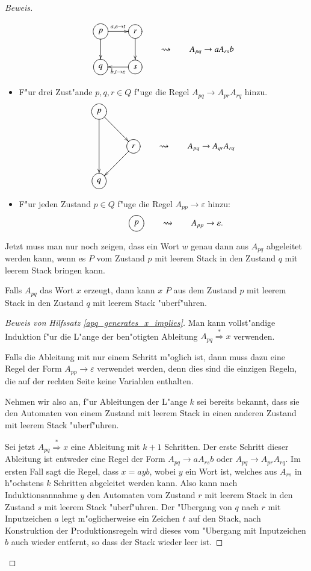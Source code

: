 \begin{proof}[Beweis]
\begin{itemize}
\[
\begin{gathered}
\entrymodifiers={++[o][F]}
\xymatrix{
{p}\ar[d]\ar[r]^{a,\varepsilon\to t}
	&{r}\ar[d]
\\
{q}
	&{s}\ar[l]^{b,t\to\varepsilon}
}
\end{gathered}
\qquad\rightsquigarrow\qquad A_{pq}\to aA_{rs}b
\]


\item F"ur drei Zust"ande $p,q,r\in Q$ f"uge die Regel 
$A_{pq}\to A_{pr}A_{rq}$ hinzu.
\[
\begin{gathered}
\entrymodifiers={++[o][F]}
\xymatrix{
{p}\ar[dr]\ar[dd]
\\
*+\txt{}
	&{r}\ar[dl]
\\
{q}
}
\end{gathered}
\qquad\rightsquigarrow\qquad A_{pq}\to A_{qr}A_{rq}
\]
\item F"ur jeden Zustand $p\in Q$ f"uge die Regel $A_{pp}\to \varepsilon$
hinzu:
\[
\begin{gathered}
\entrymodifiers={++[o][F]}
\xymatrix{
*+\txt{}
	&{p}
}
\end{gathered}
\qquad\rightsquigarrow\qquad
A_{pp}\to\varepsilon.
\]
\end{itemize}
Jetzt muss man nur noch zeigen, dass ein Wort $w$ genau dann aus $A_{pq}$
abgeleitet werden kann, wenn es $P$ vom Zustand $p$ mit leerem Stack
in den Zustand $q$ mit leerem Stack bringen kann.


\begin{hilfssatz}\label{apq_generates_x_implies}
Falls $A_{pq}$ das Wort $x$ erzeugt, dann kann $x$ $P$ aus dem Zustand
$p$ mit leerem Stack in den Zustand $q$ mit leerem Stack "uberf"uhren.
\end{hilfssatz}

\begin{proof}[Beweis von Hilfssatz \ref{apq_generates_x_implies}]
Man kann vollst"andige Induktion f"ur die L"ange der be\-n"otigten 
Ableitung $A_{pq}\overset{*}{\Rightarrow} x$ verwenden.

Falls die Ableitung mit nur einem Schritt m"oglich ist, dann muss
dazu eine Regel der Form $A_{pp}\to\varepsilon$ verwendet werden,
denn dies sind die einzigen Regeln, die auf der rechten Seite
keine Variablen enthalten. 

Nehmen wir also an, f"ur Ableitungen der L"ange $k$ sei bereits
bekannt, dass sie den Automaten von einem Zustand mit leerem Stack
in einen anderen Zustand mit leerem Stack "uberf"uhren.

Sei jetzt $A_{pq}\overset{*}{\Rightarrow}x$ eine Ableitung mit $k+1$
Schritten. Der erste Schritt dieser Ableitung ist entweder eine
Regel der Form $A_{pq}\to aA_{rs}b$ oder $A_{pq}\to A_{pr}A_{rq}$.
Im ersten Fall sagt die Regel, dass $x=ayb$, wobei $y$ ein
Wort ist, welches aus $A_{rs}$ in h"ochstens $k$ Schritten abgeleitet
werden kann. Also kann nach Induktionsannahme $y$ den Automaten vom
Zustand $r$ mit leerem Stack in den Zustand $s$ mit leerem Stack
"uberf"uhren. Der "Ubergang von $q$ nach $r$ mit Inputzeichen $a$
legt m"oglicherweise ein Zeichen $t$ auf den Stack, nach Konstruktion
der Produktionsregeln wird dieses vom "Ubergang mit Inputzeichen $b$
auch wieder entfernt, so dass der Stack wieder leer ist.


\end{proof}
\end{proof}
